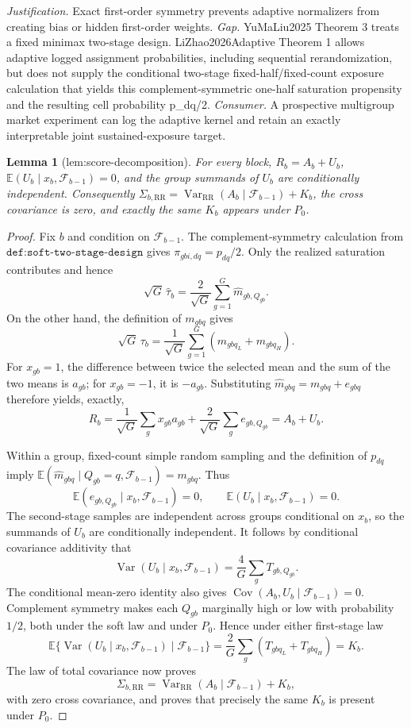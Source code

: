 \documentclass{article}
\newtheorem{lemma}{Lemma}
\begin{document}
\par\smallskip\noindent \textit{Justification.} Exact first-order symmetry prevents adaptive normalizers from creating bias or hidden first-order weights. \textit{Gap.} YuMaLiu2025 Theorem 3 treats a fixed minimax two-stage design. LiZhao2026Adaptive Theorem 1 allows adaptive logged assignment probabilities, including sequential rerandomization, but does not supply the conditional two-stage fixed-half/fixed-count exposure calculation that yields this complement-symmetric one-half saturation propensity and the resulting cell probability p\_dq/2. \textit{Consumer.} A prospective multigroup market experiment can log the adaptive kernel and retain an exactly interpretable joint sustained-exposure target.

\begin{lemma}[lem:score-decomposition]\label{lem:score-decomposition}
For every block, \(R_b=A_b+U_b\), \(\mathbb E(U_b\mid x_b,\mathcal F_{b-1})=0\), and the group summands of \(U_b\) are conditionally independent. Consequently \(\Sigma_{b,\mathrm{RR}}=\operatorname{Var}_{\mathrm{RR}}(A_b\mid\mathcal F_{b-1})+K_b\), the cross covariance is zero, and exactly the same \(K_b\) appears under \(P_0\).
\end{lemma}
\begin{proof}
Fix \(b\) and condition on \(\mathcal F_{b-1}\).  The complement-symmetry calculation from \(\texttt{def:soft-two-stage-design}\) gives \(\pi_{gbi,dq}=p_{dq}/2\).  Only the realized saturation contributes and hence
\[
 \sqrt G\,\widehat\tau_b
 =\frac{2}{\sqrt G}\sum_{g=1}^G\widehat m_{gb,Q_{gb}}.
\]
On the other hand, the definition of \(m_{gbq}\) gives
\[
 \sqrt G\,\tau_b
 =\frac1{\sqrt G}\sum_{g=1}^G(m_{gbq_L}+m_{gbq_H}).
\]
For \(x_{gb}=1\), the difference between twice the selected mean and the sum of the two means is \(a_{gb}\); for \(x_{gb}=-1\), it is \(-a_{gb}\).  Substituting \(\widehat m_{gbq}=m_{gbq}+e_{gbq}\) therefore yields, exactly,
\[
 R_b=\frac1{\sqrt G}\sum_gx_{gb}a_{gb}
       +\frac2{\sqrt G}\sum_ge_{gb,Q_{gb}}=A_b+U_b.
\]

Within a group, fixed-count simple random sampling and the definition of \(p_{dq}\) imply \(\mathbb E(\widehat m_{gbq}\mid Q_{gb}=q,\mathcal F_{b-1})=m_{gbq}\).  Thus
\[
 \mathbb E(e_{gb,Q_{gb}}\mid x_b,\mathcal F_{b-1})=0,
 \qquad
 \mathbb E(U_b\mid x_b,\mathcal F_{b-1})=0.
\]
The second-stage samples are independent across groups conditional on \(x_b\), so the summands of \(U_b\) are conditionally independent.  It follows by conditional covariance additivity that
\[
 \operatorname{Var}(U_b\mid x_b,\mathcal F_{b-1})
 =\frac4G\sum_gT_{gb,Q_{gb}}.
\]
The conditional mean-zero identity also gives
\(\operatorname{Cov}(A_b,U_b\mid\mathcal F_{b-1})=0\).  Complement symmetry makes each \(Q_{gb}\) marginally high or low with probability \(1/2\), both under the soft law and under \(P_0\).  Hence under either first-stage law
\[
 \mathbb E\{\operatorname{Var}(U_b\mid x_b,\mathcal F_{b-1})
          \mid\mathcal F_{b-1}\}
 =\frac2G\sum_g(T_{gbq_L}+T_{gbq_H})=K_b.
\]
The law of total covariance now proves
\[
 \Sigma_{b,\mathrm{RR}}
 =\operatorname{Var}_{\mathrm{RR}}(A_b\mid\mathcal F_{b-1})+K_b,
\]
with zero cross covariance, and proves that precisely the same \(K_b\) is present under \(P_0\).
\end{proof}
\end{document}
